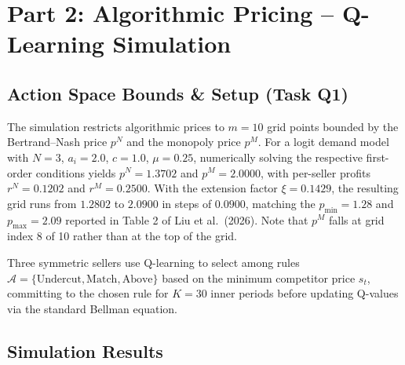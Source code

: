 \documentclass[11pt]{article}
\begin{document}
\section{Part 2: Algorithmic Pricing -- Q-Learning Simulation}

\subsection{Action Space Bounds \& Setup (Task Q1)}

The simulation restricts algorithmic prices to $m = 10$ grid points bounded by
the Bertrand--Nash price $p^N$ and the monopoly price $p^M$. For a logit demand
model with $N = 3$, $a_i = 2.0$, $c = 1.0$, $\mu = 0.25$, numerically solving
the respective first-order conditions yields $p^N = 1.3702$ and $p^M = 2.0000$,
with per-seller profits $r^N = 0.1202$ and $r^M = 0.2500$. With the extension
factor $\xi = 0.1429$, the resulting grid runs from $1.2802$ to $2.0900$ in
steps of $0.0900$, matching the $p_{\min} = 1.28$ and $p_{\max} = 2.09$
reported in Table 2 of Liu et al.\ (2026). Note that $p^M$ falls at grid index
8 of 10 rather than at the top of the grid.

Three symmetric sellers use Q-learning to select among rules
$\mathcal{A} = \{\text{Undercut}, \text{Match}, \text{Above}\}$ based on the
minimum competitor price $s_t$, committing to the chosen rule for $K = 30$
inner periods before updating Q-values via the standard Bellman equation.

\subsection{Simulation Results}
\end{document}
